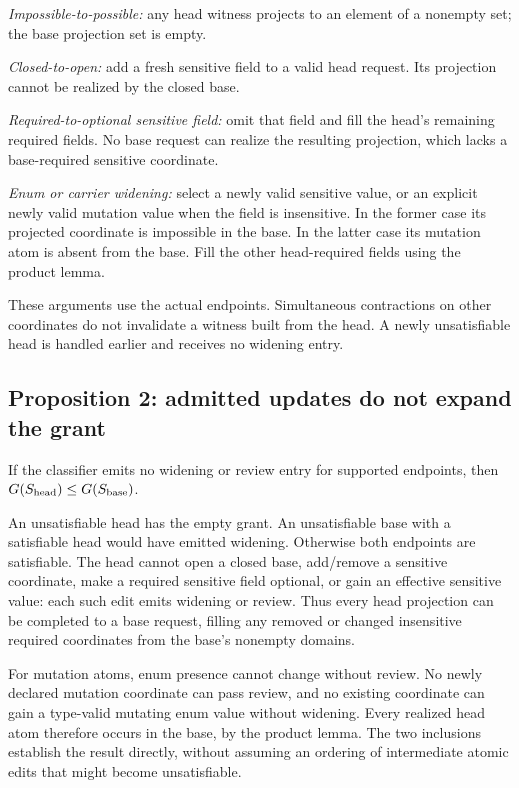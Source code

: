\emph{Impossible-to-possible:} any head witness projects to an element of a nonempty set; the base projection set is empty.

\emph{Closed-to-open:} add a fresh sensitive field to a valid head request. Its projection cannot be realized by the closed base.

\emph{Required-to-optional sensitive field:} omit that field and fill the head's remaining required fields. No base request can realize the resulting projection, which lacks a base-required sensitive coordinate.

\emph{Enum or carrier widening:} select a newly valid sensitive value, or an explicit newly valid mutation value when the field is insensitive. In the former case its projected coordinate is impossible in the base. In the latter case its mutation atom is absent from the base. Fill the other head-required fields using the product lemma.

These arguments use the actual endpoints. Simultaneous contractions on other coordinates do not invalidate a witness built from the head. A newly unsatisfiable head is handled earlier and receives no widening entry.

\subsection{Proposition 2: admitted updates do not expand the grant}\label{proposition-2-admitted-updates-do-not-expand-the-grant}

If the classifier emits no widening or review entry for supported endpoints, then \(G(S_{\rm head})\leq G(S_{\rm base})\).

An unsatisfiable head has the empty grant. An unsatisfiable base with a satisfiable head would have emitted widening. Otherwise both endpoints are satisfiable. The head cannot open a closed base, add/remove a sensitive coordinate, make a required sensitive field optional, or gain an effective sensitive value: each such edit emits widening or review. Thus every head projection can be completed to a base request, filling any removed or changed insensitive required coordinates from the base's nonempty domains.

For mutation atoms, enum presence cannot change without review. No newly declared mutation coordinate can pass review, and no existing coordinate can gain a type-valid mutating enum value without widening. Every realized head atom therefore occurs in the base, by the product lemma. The two inclusions establish the result directly, without assuming an ordering of intermediate atomic edits that might become unsatisfiable.

